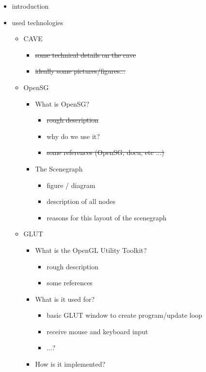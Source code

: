 \documentclass[conference]{acmsiggraph}
\begin{document}
\label{SEC:VISUALISATION}

\begin{itemize}
\item introduction
\item{used technologies
	\begin{itemize}
	\item{CAVE
		\begin{itemize}
		\item \sout{some technical details on the cave} \checkmark 
		\item \sout{ideally some pictures/figures...} \checkmark
		\end{itemize}
	}
	\item{OpenSG
		\begin{itemize}
		\item{ What is OpenSG?
			\begin{itemize}
			\item \sout{rough description}\checkmark
			\item why do we use it?
			\item \sout{some references (OpenSG, docu, etc ...)} \checkmark
			\end{itemize}
		}
		\item{The Scenegraph
			\begin{itemize}
			\item figure / diagram
			\item description of all nodes
			\item reasons for this layout of the scenegraph
			\end{itemize}
		}
		\end{itemize}
	}
	\item{GLUT
		\begin{itemize}
		\item{What is the OpenGL Utility Toolkit?
			\begin{itemize}
			\item rough description
			\item some references
			\end{itemize}
		}
		\item{What is it used for?
			\begin{itemize}
			\item basic GLUT window to create program/update loop
			\item receive mouse and keyboard input
			\item ...?
			\end{itemize}
		}
		\item How is it implemented?

\end{itemize}}
\end{itemize}}
\end{itemize}
\end{document}
